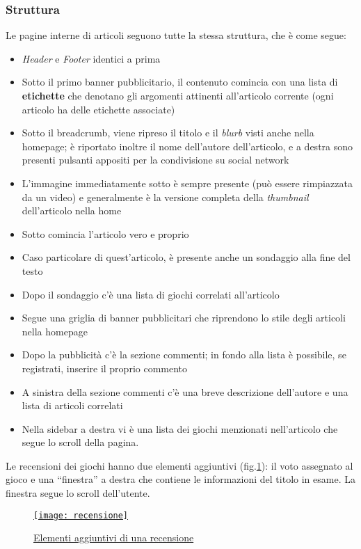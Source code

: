 \subsubsection{Struttura}
\label{sub:articolo-struttura}
Le pagine interne di articoli seguono tutte la stessa struttura, che è come segue:
\begin{itemize}
    \item \emph{Header} e \emph{Footer} identici a prima
    \item Sotto il primo banner pubblicitario, il contenuto comincia con una lista di \textbf{etichette} che denotano gli argomenti attinenti all'articolo corrente (ogni articolo ha delle etichette associate)
    \item Sotto il breadcrumb, viene ripreso il titolo e il \emph{blurb} visti anche nella homepage; è riportato inoltre il nome dell'autore dell'articolo, e a destra sono presenti pulsanti appositi per la condivisione su social network
    \item L'immagine immediatamente sotto è sempre presente (può essere rimpiazzata da un video) e generalmente è la versione completa della \emph{thumbnail} dell'articolo nella home
    \item Sotto comincia l'articolo vero e proprio
    \item Caso particolare di quest'articolo, è presente anche un sondaggio alla fine del testo
    \item Dopo il sondaggio c'è una lista di giochi correlati all'articolo
    \item Segue una griglia di banner pubblicitari che riprendono lo stile degli articoli nella homepage
    \item Dopo la pubblicità c'è la sezione commenti; in fondo alla lista è possibile, se registrati, inserire il proprio commento
    \item A sinistra della sezione commenti c'è una breve descrizione dell'autore e una lista di articoli correlati
    \item Nella sidebar a destra vi è una lista dei giochi menzionati nell'articolo che segue lo scroll della pagina.
\end{itemize}
Le recensioni dei giochi hanno due elementi aggiuntivi (fig.\ref{fig:recensione}): il voto assegnato al gioco e una ``finestra'' a destra che contiene le informazioni del titolo in esame. La finestra segue lo scroll dell'utente.
\begin{figure}[h]
    \centering
    \href{pic/recensione.jpeg}{\texttt{[image: recensione]}}
    \caption{\href{pic/recensione.jpeg}{Elementi aggiuntivi di una recensione}\label{fig:recensione}} %
\end{figure}


